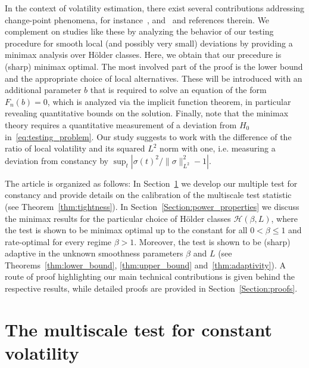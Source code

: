 \documentclass[10.5pt,letter]{article}
\numberwithin{equation}{section}
\theoremstyle{definition}
\newcommand{\1}{\mathbbm{1}}
\begin{document}
In the context of volatility estimation, there exist several contributions addressing change-point phenomena, for instance~\cite{Bibinger/Jirak/Vetter}, \cite{Bibinger/Madensoy} and~\cite{Kokoszka} and references therein. We complement on studies like these by analyzing the behavior of our testing procedure for smooth local (and possibly very small) deviations by providing a minimax analysis over Hölder classes. Here, we obtain that our precedure is (sharp) minimax optimal. The most involved part of the proof is the lower bound and the appropriate choice of local alternatives. These will be introduced with an additional parameter $b$ that is required to solve an equation of the form $F_n(b)=0$, which is analyzed via the implicit function theorem, in particular revealing quantitative bounds on the solution.
Finally, note that the minimax theory requires a quantitative measurement of a deviation from $H_0$ in~\eqref{eq:testing_problem}. Our study suggests to work with the difference of the ratio of local volatility and its squared $L^2$ norm with one, i.e. measuring a deviation from constancy by $\sup_{t}|\sigma(t)^2 /\|\sigma\|_{L^2}^2 - 1|$. \smallskip


The article is organized as follows: In Section~\ref{Section:calibration} we develop our multiple test for constancy and provide details on the calibration of the multiscale test statistic (see Theorem~\ref{thm:tightness}). In Section~\ref{Section:power_properties} we discuss the minimax results for the particular choice of Hölder classes $\mathcal{H}(\beta,L)$, where the test is shown to be minimax optimal up to the constant for all $0<\beta\leq 1$ and rate-optimal for every regime $\beta>1$. Moreover, the test is shown to be (sharp) adaptive in the unknown smoothness parameters $\beta$ and $L$ (see Theorems~\ref{thm:lower_bound}, \ref{thm:upper_bound} and~\ref{thm:adaptivity}). A route of proof highlighting our main technical contributions is given behind the respective results, while detailed proofs are provided in Section~\ref{Section:proofs}.




\section{The multiscale test for constant volatility}\label{Section:calibration}
\end{document}
